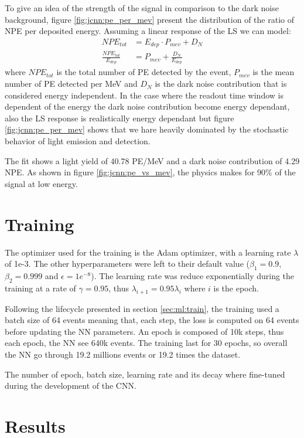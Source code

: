 \documentclass[../main.tex]{subfiles}
\begin{document}
To give an idea of the strength of the signal in comparison to the dark noise background, figure \ref{fig:jcnn:pe_per_mev} present the distribution of the ratio of NPE per deposited energy. Assuming a linear response of the LS we can model:
\begin{align}
  NPE_{tot} &= E_{dep} \cdot P_{mev} + D_{N} \\
  \frac{NPE_{tot}}{E_{dep}} &= P_{mev} + \frac{D_{N}}{E_{dep}} \label{eq:jcnn:pe_per_mev}
\end{align}
where $NPE_{tot}$ is the total number of PE detected by the event, $P_{mev}$ is the mean number of PE detected per MeV and $D_{N}$ is the dark noise contribution that is considered energy independent. In the case where the readout time window is dependent of the energy the dark noise contribution become energy dependant, also the LS response is realistically energy dependant but figure \ref{fig:jcnn:pe_per_mev} shows that we hare heavily dominated by the stochastic behavior of light emission and detection.

The fit shows a light yield of 40.78 PE/MeV and a dark noise contribution of 4.29 NPE. As shown in figure \ref{fig:jcnn:pe_vs_mev}, the physics makes for 90\% of the signal at low energy.

\section{Training}

The optimizer used for the training is the Adam \cite{kingma_adam_2017} optimizer, with a learning rate $\lambda$ of 1e-3. The other hyperparameters were left to their default value ($\beta_1= 0.9$, $\beta_2 = 0.999$ and $\epsilon = 1e^{-8}$). The learning rate was reduce exponentially during the training at a rate of $\gamma = 0.95$, thus $\lambda_{i+1} = 0.95\lambda_i$ where $i$ is the epoch.

Following the lifecycle presented in section \ref{sec:ml:train}, the training used a batch size of 64 events meaning that, each step, the loss is computed on 64 events before updating the NN parameters. An epoch is composed of 10k steps, thus each epoch, the NN see 640k events. The training last for 30 epochs, so overall the NN go through 19.2 millions events or 19.2 times the dataset.

The number of epoch, batch size, learning rate and its decay where fine-tuned during the development of the CNN.

\section{Results}
\label{sec:jcnn:results}
\end{document}
